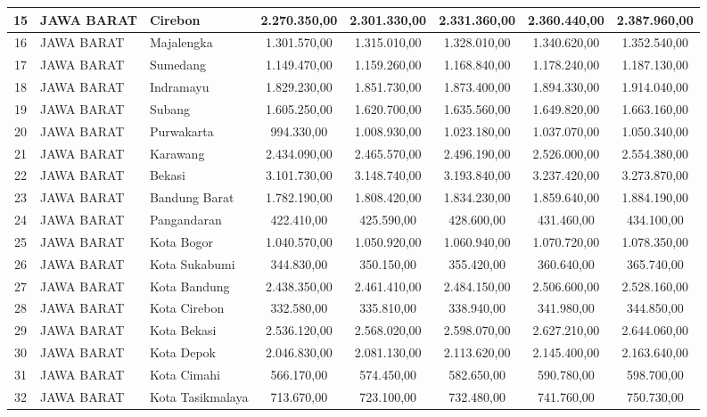 \begin{spacing}{1.0}
\begin{longtable}{|c|p{2.2cm}|p{2.8cm}|c|c|c|c|c|}
15 & JAWA BARAT & Cirebon & 2.270.350,00 & 2.301.330,00 & 2.331.360,00 & 2.360.440,00 & 2.387.960,00 \\ \hline
16 & JAWA BARAT & Majalengka & 1.301.570,00 & 1.315.010,00 & 1.328.010,00 & 1.340.620,00 & 1.352.540,00 \\ \hline
17 & JAWA BARAT & Sumedang & 1.149.470,00 & 1.159.260,00 & 1.168.840,00 & 1.178.240,00 & 1.187.130,00 \\ \hline
18 & JAWA BARAT & Indramayu & 1.829.230,00 & 1.851.730,00 & 1.873.400,00 & 1.894.330,00 & 1.914.040,00 \\ \hline
19 & JAWA BARAT & Subang & 1.605.250,00 & 1.620.700,00 & 1.635.560,00 & 1.649.820,00 & 1.663.160,00 \\ \hline
20 & JAWA BARAT & Purwakarta & 994.330,00 & 1.008.930,00 & 1.023.180,00 & 1.037.070,00 & 1.050.340,00 \\ \hline
21 & JAWA BARAT & Karawang & 2.434.090,00 & 2.465.570,00 & 2.496.190,00 & 2.526.000,00 & 2.554.380,00 \\ \hline
22 & JAWA BARAT & Bekasi & 3.101.730,00 & 3.148.740,00 & 3.193.840,00 & 3.237.420,00 & 3.273.870,00 \\ \hline
23 & JAWA BARAT & Bandung Barat & 1.782.190,00 & 1.808.420,00 & 1.834.230,00 & 1.859.640,00 & 1.884.190,00 \\ \hline
24 & JAWA BARAT & Pangandaran & 422.410,00 & 425.590,00 & 428.600,00 & 431.460,00 & 434.100,00 \\ \hline
25 & JAWA BARAT & Kota Bogor & 1.040.570,00 & 1.050.920,00 & 1.060.940,00 & 1.070.720,00 & 1.078.350,00 \\ \hline
26 & JAWA BARAT & Kota Sukabumi & 344.830,00 & 350.150,00 & 355.420,00 & 360.640,00 & 365.740,00 \\ \hline
27 & JAWA BARAT & Kota Bandung & 2.438.350,00 & 2.461.410,00 & 2.484.150,00 & 2.506.600,00 & 2.528.160,00 \\ \hline
28 & JAWA BARAT & Kota Cirebon & 332.580,00 & 335.810,00 & 338.940,00 & 341.980,00 & 344.850,00 \\ \hline
29 & JAWA BARAT & Kota Bekasi & 2.536.120,00 & 2.568.020,00 & 2.598.070,00 & 2.627.210,00 & 2.644.060,00 \\ \hline
30 & JAWA BARAT & Kota Depok & 2.046.830,00 & 2.081.130,00 & 2.113.620,00 & 2.145.400,00 & 2.163.640,00 \\ \hline
31 & JAWA BARAT & Kota Cimahi & 566.170,00 & 574.450,00 & 582.650,00 & 590.780,00 & 598.700,00 \\ \hline
32 & JAWA BARAT & Kota Tasikmalaya & 713.670,00 & 723.100,00 & 732.480,00 & 741.760,00 & 750.730,00 \\ \hline

\end{longtable}
\end{spacing}
